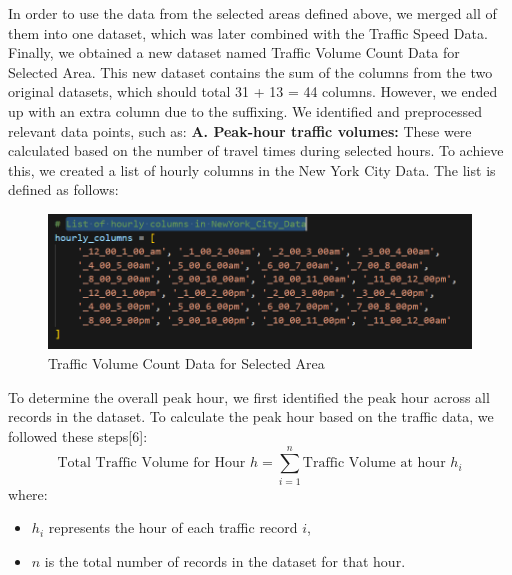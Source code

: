 In order to use the data from the selected areas defined above, we merged all of them into one dataset, which was later combined with the Traffic Speed Data. Finally, we obtained a new dataset named Traffic Volume Count Data for Selected Area. 
\newline
This new dataset contains the sum of the columns from the two original datasets, which should total 31 + 13 = 44 columns. However, we ended up with an extra column due to the suffixing. 
\newline
We identified and preprocessed relevant data points, such as:
\newline 
\newline
\textbf{A. Peak-hour traffic volumes:}
\newline
\newline
 These were calculated based on the number of travel times during selected hours. To achieve this, we created a list of hourly columns in the New York City Data. The list is defined as follows:
\begin{figure}[H]
    \centering
    \includegraphics[width=\linewidth]{figures/List_of_hourly_columns.PNG}
    \caption{Traffic Volume Count Data for Selected Area}
    \label{fig:ListOfHourlyColumnsInNewYorkCity}
\end{figure}
To determine the overall peak hour, we first identified the peak hour across all records in the dataset. To calculate the peak hour based on the traffic data, we followed these steps[6]:
\newline
\begin{equation}
\text{Total Traffic Volume for Hour } h = \sum_{i=1}^{n} \text{Traffic Volume at hour } h_i
\end{equation}
where:
\begin{itemize}
    \item \( h_i \) represents the hour of each traffic record \( i \),
    \item \( n \) is the total number of records in the dataset for that hour.
\end{itemize}

